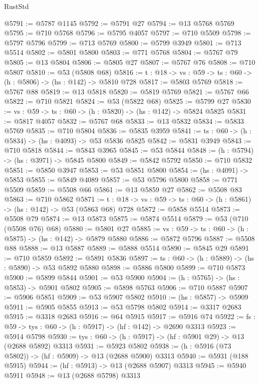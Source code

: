 \begin{lexlean}{RustStd}
\begin{coremodule}
@5791 := @5787 @1145
@5792 := @5791 @27
@5794 := @13 @5768 @5769
@5795 := @710 @5768
@5796 := @5795 @4057
@5797 := @710 @5509
@5798 := @5797 @5796
@5799 := @713 @5769
@5800 := @5799 @3949
@5801 := @713 @5514
@5802 := @5801 @5800
@5803 := @771 @5768
@5804 := @5767 @79
@5805 := @13 @5804
@5806 := @5805 @27
@5807 := @5767 @76
@5808 := @710 @5807
@5810 := @53 (@5808 @68)
@5816 := {t : @18} -> {vs : @59} -> {ts : @60} -> (h : @5806) -> (hs : @142) -> @5810 @728
@5817 := @5803 @5769
@5818 := @5767 @88
@5819 := @13 @5818
@5820 := @5819 @5769
@5821 := @5767 @66
@5822 := @710 @5821
@5824 := @53 (@5822 @68)
@5825 := @5799 @27
@5830 := {vs : @59} -> {ts : @60} -> (h : @5820) -> (hs : @142) -> @5824 @5825
@5831 := @5817 @4057
@5832 := @5767 @68
@5833 := @13 @5832
@5834 := @5833 @5769
@5835 := @710 @5804
@5836 := @5835 @3959
@5841 := {ts : @60} -> (h : @5834) -> (hs : @4093) -> @53 @5836 @5825
@5842 := @5831 @3949
@5843 := @710 @5818
@5844 := @5843 @3965
@5845 := @53 @5844
@5848 := (h : @5794) -> (hs : @3971) -> @5845 @5800
@5849 := @5842 @5792
@5850 := @710 @5832
@5851 := @5850 @3947
@5853 := @53 @5851 @5800
@5854 := (hs : @4091) -> @5853
@5855 := @5849 @4089
@5857 := @53 @5796 @5800
@5858 := @771 @5509
@5859 := @5508 @66
@5861 := @13 @5859 @27
@5862 := @5508 @83
@5863 := @710 @5862
@5871 := {t : @18} -> {vs : @59} -> {ts : @60} -> (h : @5861) -> (hs : @142) -> @53 (@5863 @68) @728
@5872 := @5858 @5514
@5873 := @5508 @79
@5874 := @13 @5873
@5875 := @5874 @5514
@5879 := @53 (@710 (@5508 @76) @68)
@5880 := @5801 @27
@5885 := {vs : @59} -> {ts : @60} -> (h : @5875) -> (hs : @142) -> @5879 @5880
@5886 := @5872 @5796
@5887 := @5508 @88
@5888 := @13 @5887
@5889 := @5888 @5514
@5890 := @5845 @29
@5891 := @710 @5859
@5892 := @5891 @5836
@5897 := {ts : @60} -> (h : @5889) -> (hs : @5890) -> @53 @5892 @5880
@5898 := @5886 @5800
@5899 := @710 @5873
@5900 := @5899 @5844
@5901 := @53 @5900
@5904 := (h : @5765) -> (hs : @5853) -> @5901 @5802
@5905 := @5898 @5763
@5906 := @710 @5887
@5907 := @5906 @5851
@5909 := @53 @5907 @5802
@5910 := (hs : @5857) -> @5909
@5911 := @5905 @5855
@5913 := @53 @5798 @5802
@5914 := @3317 @2683
@5915 := @3318 @2683
@5916 := @64 @5915
@5917 := @5916 @74
@5922 := {fs : @59} -> {tys : @60} -> (h : @5917) -> (hf : @142) -> @2690 @3313
@5923 := @5914 @5798
@5930 := {tys : @60} -> (h : @5917) -> (hf : @5901 @29) -> @13 (@2688 @5892) @3313
@5931 := @5923 @5802
@5938 := (h : @5916 (@73 @5802)) -> (hf : @5909) -> @13 (@2688 @5900) @3313
@5940 := @5931 (@188 @5915)
@5944 := (hf : @5913) -> @13 (@2688 @5907) @3313
@5945 := @5940 @5911
@5948 := @13 (@2688 @5798) @3313

\end{coremodule}
\end{lexlean}
